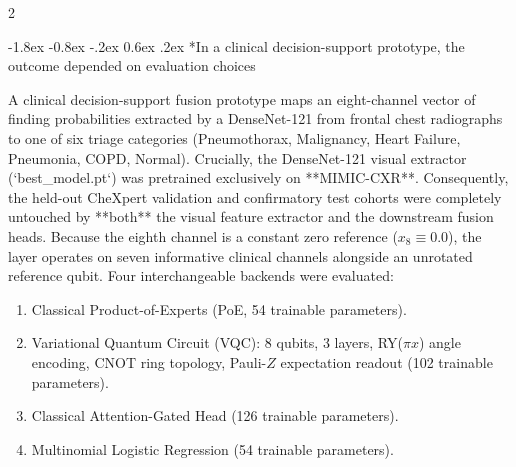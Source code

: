 \documentclass[10pt,a4paper,twoside]{article}
\makeatletter
\renewcommand{\subsection}{\@startsection{subsection}{2}{\z@}%
  {-1.8ex \@plus -0.8ex \@minus -.2ex}%
  {0.6ex \@plus.2ex}%
  {\normalfont\normalsize\sffamily\bfseries\color{naturedark}}}
\makeatother
\begin{document}
\begin{multicols}{2}

\subsection*{In a clinical decision-support prototype, the outcome depended on evaluation choices}

A clinical decision-support fusion prototype maps an eight-channel vector of finding probabilities extracted by a DenseNet-121 from frontal chest radiographs to one of six triage categories (Pneumothorax, Malignancy, Heart Failure, Pneumonia, COPD, Normal). Crucially, the DenseNet-121 visual extractor (`best\_model.pt`) was pretrained exclusively on **MIMIC-CXR**. Consequently, the held-out CheXpert validation and confirmatory test cohorts were completely untouched by **both** the visual feature extractor and the downstream fusion heads. Because the eighth channel is a constant zero reference ($x_8 \equiv 0.0$), the layer operates on seven informative clinical channels alongside an unrotated reference qubit. Four interchangeable backends were evaluated:
\begin{enumerate}
  \setlength{\itemsep}{1pt}
  \item Classical Product-of-Experts (PoE, 54 trainable parameters).
  \item Variational Quantum Circuit (VQC): 8 qubits, 3 layers, RY($\pi x$) angle encoding, CNOT ring topology, Pauli-$Z$ expectation readout (102 trainable parameters).
  \item Classical Attention-Gated Head (126 trainable parameters).
  \item Multinomial Logistic Regression (54 trainable parameters).
\end{enumerate}


\end{multicols}
\end{document}
